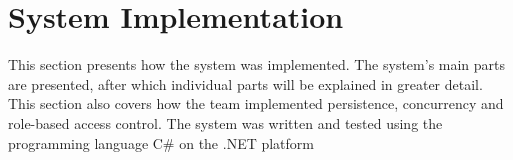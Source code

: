 \section{System Implementation}
This section presents how the system was implemented. The system’s main parts are presented, after which individual parts will be explained in greater detail. This section also covers how the team implemented persistence, concurrency and role-based access control. \newline
The system was written and tested using the programming language C\# on the .NET platform











